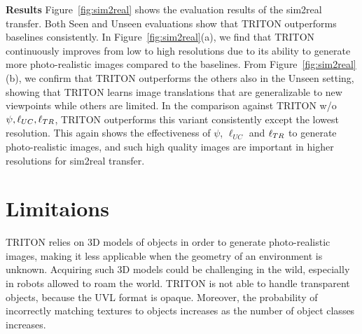 \documentclass{article}
\begin{document}
\textbf{Results} Figure~\ref{fig:sim2real} shows the evaluation results of the sim2real transfer. Both Seen and Unseen evaluations show that TRITON outperforms baselines consistently. In Figure~\ref{fig:sim2real}(a), we find that TRITON continuously improves from low to high resolutions due to its ability to generate more photo-realistic images compared to the baselines.
From Figure~\ref{fig:sim2real}(b), we confirm that TRITON outperforms the others also in the Unseen setting, showing that TRITON learns image translations that are generalizable to new viewpoints while others are limited.
In the comparison against TRITON w/o $\psi,\ell_{UC},\ell_{TR}$, TRITON outperforms this variant consistently except the lowest resolution. This again shows the effectiveness of $\psi$, $\ell_{UC}$ and $\ell_{TR}$ to generate photo-realistic images, and such high quality images are important in higher resolutions for sim2real transfer.






\vspace{-8pt}
\section{Limitaions}
\label{sec:Limitations} 
TRITON relies on 3D models of objects in order to generate photo-realistic images, making it less applicable when the geometry of an environment is unknown. Acquiring such 3D models could be challenging in the wild, especially in robots allowed to roam the world. TRITON is not able to handle transparent objects, because the UVL format is opaque. Moreover, the probability of incorrectly matching textures to objects increases as the number of object classes increases.


\end{document}
